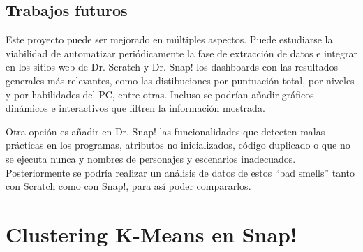 \documentclass[a4paper, 12pt]{book}
\begin{document}
\section{Trabajos futuros}
\label{sec:trabajos_futuros}

Este proyecto puede ser mejorado en múltiples aspectos. Puede estudiarse la viabilidad de automatizar periódicamente la fase de extracción de datos e integrar en los sitios web de Dr. Scratch y Dr. Snap! los dashboards con las resultados generales más relevantes, como las distibuciones por puntuación total, por niveles y por habilidades del PC, entre otras. Incluso se podrían añadir gráficos dinámicos e interactivos que filtren la información mostrada.

Otra opción es añadir en Dr. Snap! las funcionalidades que detecten malas prácticas en los programas, atributos no inicializados, código duplicado o que no se ejecuta nunca y nombres de personajes y escenarios inadecuados. Posteriormente se podría realizar un análisis de datos de estos ``bad smells'' tanto con Scratch como con Snap!, para así poder compararlos. 



\cleardoublepage
\appendix

\chapter{Clustering K-Means en Snap!}
\label{app:k8}
\end{document}
